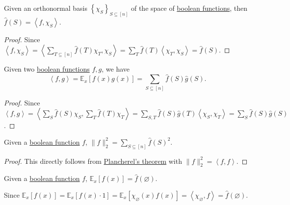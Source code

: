 \begin{proposition}
	Given an orthonormal basis \(\left\{ \chi _S \right\}_{S\subseteq [n]} \) of the space of \hyperref[def:boolean-function]{boolean functions}, then \(\hat{f} (S) = \left\langle f, \chi _S \right\rangle \).
\end{proposition}
\begin{proof}
	Since \(\left\langle f, \chi _S \right\rangle
	= \left\langle \sum_{T \subseteq [n]} \hat{f} (T) \chi _T, \chi _S \right\rangle
	= \sum_{T} \hat{f} (T) \left\langle \chi _T, \chi _S \right\rangle
	= \hat{f} (S)\).
\end{proof}

\begin{theorem}\label{thm:Plancherel}
	Given two \hyperref[def:boolean-function]{boolean functions} \(f, g\), we have
	\[
		\left\langle f, g \right\rangle = \mathbb{E}_{x}\left[f(x)g(x) \right] = \sum_{S \subseteq [n]} \hat{f} (S) \hat{g} (S).
	\]
\end{theorem}
\begin{proof}
	Since \(\left\langle f, g \right\rangle
	= \left\langle \sum_{S} \hat{f} (S) \chi _S, \sum_{T} \hat{f} (T) \chi _T \right\rangle
	= \sum_{S, T} \hat{f} (S) \hat{g} (T) \left\langle \chi _S, \chi _T  \right\rangle
	= \sum_S \hat{f}(S)\hat{g}(S)\).
\end{proof}

\begin{theorem}\label{thm:Parseval}
	Given a \hyperref[def:boolean-function]{boolean function} \(f\), \(\lVert f \rVert _2^2 = \sum_{S \subseteq [n]} \hat{f} (S)^2\).
\end{theorem}
\begin{proof}
	This directly follows from \hyperref[thm:Plancherel]{Plancherel's theorem} with \(\lVert f \rVert _2^2 = \left\langle f, f \right\rangle \).
\end{proof}

\begin{claim}
	Given a \hyperref[def:boolean-function]{boolean function} \(f\), \(\mathbb{E}_{x}\left[f(x) \right] = \hat{f} (\varnothing )\).
\end{claim}
\begin{explanation}
	Since \(\mathbb{E}_{x}\left[f(x) \right]
	= \mathbb{E}_{x}\left[f(x) \cdot 1 \right]
	= \mathbb{E}_{x}\left[\chi _\varnothing (x) f(x) \right]
	= \left\langle \chi _\varnothing , f \right\rangle
	= \hat{f} (\varnothing )\).
\end{explanation}

